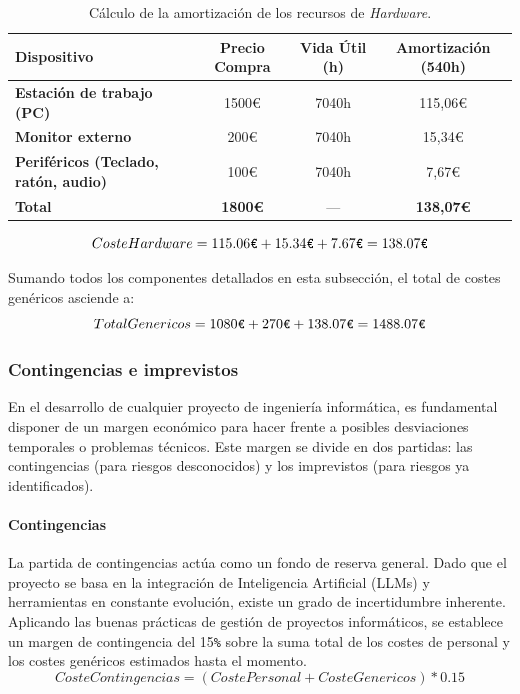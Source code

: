 \documentclass[11pt, letterpaper]{article}
\begin{document}
\begin{table}[H]
    \centering
    \begin{tabularx}{\textwidth}{X c c c}
         \toprule
         \textbf{Dispositivo} & \textbf{Precio Compra} & \textbf{Vida Útil (h)} & \textbf{Amortización (540h)} \\
         \midrule
         \textbf{Estación de trabajo (PC)} & 1500€ & 7040h & 115,06€ \\
         \textbf{Monitor externo} & 200€ & 7040h & 15,34€ \\
         \textbf{Periféricos (Teclado, ratón, audio)} & 100€ & 7040h & 7,67€ \\
         \midrule
         \textbf{Total} & \textbf{1800€} & --- & \textbf{138,07€} \\
         \bottomrule
    \end{tabularx}
    \caption{Cálculo de la amortización de los recursos de \textit{Hardware}.}
    \label{tab:amortizacion_hardware}
\end{table}

\begin{equation}
    Coste Hardware = 115{.}06\verb|€| + 15{.}34\verb|€| + 7{.}67\verb|€| = 138{.}07\verb|€|
\end{equation}

Sumando todos los componentes detallados en esta subsección, el total de costes genéricos asciende a:
\begin{equation}
    Total Genericos = 1080\verb|€| + 270\verb|€| + 138{.}07\verb|€| = 1488{.}07\verb|€|
\end{equation}

\subsubsection{Contingencias e imprevistos}
\label{sec:imprevistos}
En el desarrollo de cualquier proyecto de ingeniería informática, es fundamental disponer de un margen económico para hacer frente a posibles desviaciones temporales o problemas técnicos. Este margen se divide en dos partidas: las contingencias (para riesgos desconocidos) y los imprevistos (para riesgos ya identificados).

\paragraph{Contingencias}
\label{sec:contingencias}
La partida de contingencias actúa como un fondo de reserva general. Dado que el proyecto se basa en la integración de Inteligencia Artificial (LLMs) y herramientas en constante evolución, existe un grado de incertidumbre inherente. Aplicando las buenas prácticas de gestión de proyectos informáticos, se establece un margen de contingencia del 15\verb|%| sobre la suma total de los costes de personal y los costes genéricos estimados hasta el momento.
\begin{equation}
    Coste Contingencias = (Coste Personal + Coste Genericos) * 0{.}15
\end{equation}
\end{document}
